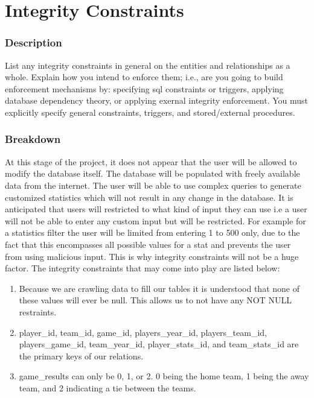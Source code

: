 \documentclass[12pt,letterpaper]{article}
\begin{document}
\clearpage\null

\section{Integrity Constraints}

\subsubsection{Description}
List any integrity constraints in general on the entities and relationships as a
whole. Explain how you intend to enforce them; i.e., are you going to build enforcement
mechanisms by: specifying sql constraints or triggers, applying database dependency theory, or applying exernal integrity enforcement. You must explicitly specify general constraints, triggers, and stored/external procedures.

\subsubsection{Breakdown}
At this stage of the project, it does not appear that the user will be allowed to modify the database itself. The database will be populated with freely available data from the internet. The user will be able to use complex queries to generate customized statistics which will not result in any change in the database. It is anticipated that users will restricted to what kind of input they can use i.e a user will not be able to enter any custom input but will be restricted. For example for a statistics filter the user will be limited from entering 1 to 500 only, due to the fact that this encompasses all possible values for a stat and prevents the user from using malicious input. This is why integrity constraints will not be a huge factor. The integrity constraints that may come into play are listed below:

\begin{enumerate}
\item Because we are crawling data to fill our tables it is understood that none of these values will ever be null.  This allows us to not have any NOT NULL restraints.
\item player\_id, team\_id, game\_id, players\_year\_id, players\_team\_id, players\_game\_id, team\_year\_id, player\_stats\_id, and team\_stats\_id are the primary keys of our relations.
\item game\_results can only be 0, 1, or 2. 0 being the home team, 1 being the away team, and 2 indicating a tie between the teams.
\end{enumerate}
\end{document}
